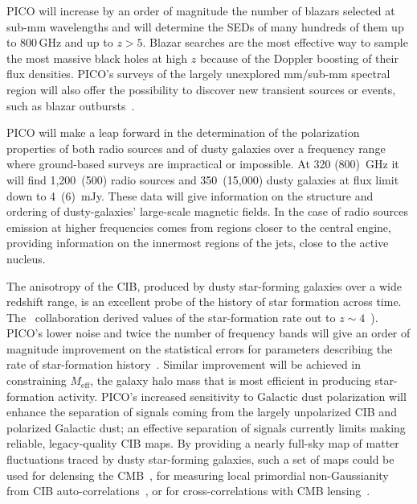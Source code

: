 \documentclass[PICOReport.tex]{subfiles}
\begin{document}
PICO will increase by an order of magnitude the number of blazars selected at sub-mm wavelengths and will determine the SEDs of many hundreds of them up to 800\,GHz and up to $z> 5$. Blazar searches are the most effective way to sample the most massive black holes at high $z$ because of the Doppler boosting of their flux densities. PICO's surveys of the largely unexplored mm/sub-mm spectral region will also offer the possibility to discover new transient sources or events, such as blazar outbursts~\cite{Metzger2015}.

PICO will make a leap forward in the determination of the polarization properties of both radio sources and of dusty galaxies over a frequency range where ground-based surveys are impractical or impossible. At 320 (800)~GHz it will find 1,200~(500) radio sources and 350~(15,000) dusty galaxies at flux limit down to 4~(6)~mJy.  These data will give information on the structure and ordering of dusty-galaxies' large-scale magnetic fields. In the case of radio sources emission at higher frequencies comes from regions closer to the central engine, providing information on the innermost regions of the jets, close to the active nucleus. 

The anisotropy of the \ac{CIB}, produced by dusty star-forming galaxies over a wide redshift range, is an excellent probe of the history of star formation across time. The \planck\ collaboration derived values of the star-formation rate out to $z\sim4$~\cite{2014A&A...571A..30P,2014A&A...571A..18P,madau2014}). PICO's lower noise and twice the number of frequency bands will give an order of magnitude improvement on the statistical errors for parameters describing the rate of star-formation history~\cite{Wu:2016hej}. Similar improvement will be achieved in constraining $M_{\mathrm{eff}}$, the galaxy halo mass that is most efficient in producing star-formation activity. PICO's increased sensitivity to Galactic dust polarization will enhance the separation of signals coming from the largely unpolarized \ac{CIB} and polarized Galactic dust; an effective separation of signals currently limits making reliable, legacy-quality \ac{CIB} maps. 
By providing a nearly full-sky map of matter fluctuations traced by dusty star-forming galaxies, such a set of maps could be used for delensing the CMB~\cite{Sherwin/Schmittfull}, for measuring local primordial non-Gaussianity from \ac{CIB} auto-correlations~\cite{tucci}, or for cross-correlations with CMB lensing~\cite{Schmittfull/Seljak}.

\end{document}
